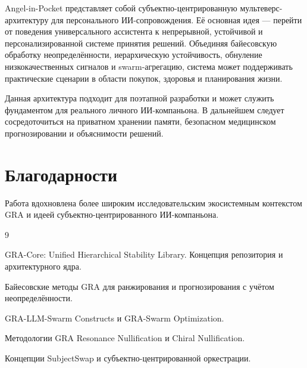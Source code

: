 \documentclass[11pt,a4paper]{article}
\begin{document}
Angel-in-Pocket представляет собой субъектно-центрированную мультеверс-архитектуру для персонального ИИ-сопровождения. Её основная идея — перейти от поведения универсального ассистента к непрерывной, устойчивой и персонализированной системе принятия решений. Объединяя байесовскую обработку неопределённости, иерархическую устойчивость, обнуление низкокачественных сигналов и swarm-агрегацию, система может поддерживать практические сценарии в области покупок, здоровья и планирования жизни.

Данная архитектура подходит для поэтапной разработки и может служить фундаментом для реального личного ИИ-компаньона. В дальнейшем следует сосредоточиться на приватном хранении памяти, безопасном медицинском прогнозировании и объяснимости решений.

\section*{Благодарности}

Работа вдохновлена более широким исследовательским экосистемным контекстом GRA и идеей субъектно-центрированного ИИ-компаньона.

\begin{thebibliography}{9}

GRA-Core: Unified Hierarchical Stability Library. Концепция репозитория и архитектурного ядра.

Байесовские методы GRA для ранжирования и прогнозирования с учётом неопределённости.

GRA-LLM-Swarm Constructs и GRA-Swarm Optimization.

Методологии GRA Resonance Nullification и Chiral Nullification.

Концепции SubjectSwap и субъектно-центрированной оркестрации.

\end{thebibliography}
\end{document}
